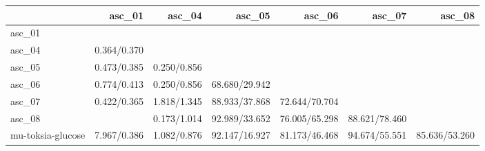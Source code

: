 \begin{tabular}{lrrrrrr}
\toprule
 & asc_01 & asc_04 & asc_05 & asc_06 & asc_07 & asc_08 \\
\midrule
asc_01 &  &  &  &  &  &  \\
asc_04 & 0.364/0.370 &  &  &  &  &  \\
asc_05 & 0.473/0.385 & 0.250/0.856 &  &  &  &  \\
asc_06 & 0.774/0.413 & 0.250/0.856 & 68.680/29.942 &  &  &  \\
asc_07 & 0.422/0.365 & 1.818/1.345 & 88.933/37.868 & 72.644/70.704 &  &  \\
asc_08 &  & 0.173/1.014 & 92.989/33.652 & 76.005/65.298 & 88.621/78.460 &  \\
mu-toksia-glucose & 7.967/0.386 & 1.082/0.876 & 92.147/16.927 & 81.173/46.468 & 94.674/55.551 & 85.636/53.260 \\
\bottomrule
\end{tabular}
